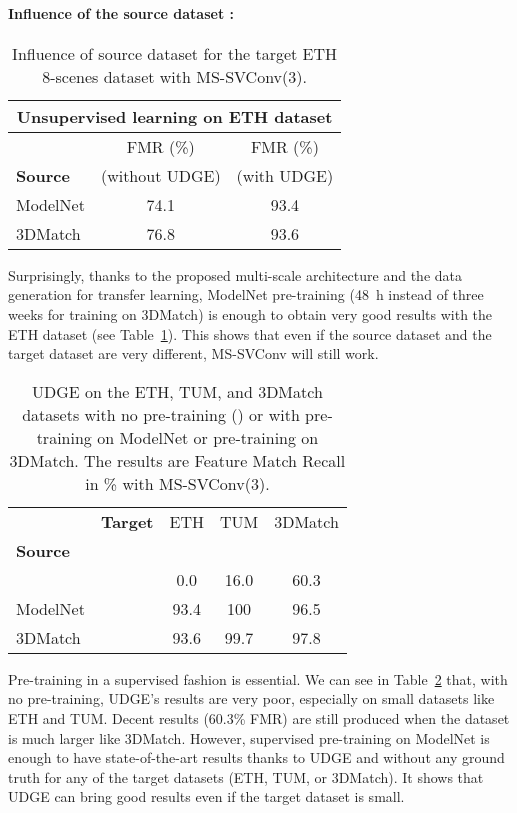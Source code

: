 \documentclass[10pt,twocolumn,letterpaper]{article}
\begin{document}
\paragraph{Influence of the source dataset :}
\begin{table}[ht]
\centering
\small
\begin{tabular}[t]{lcc}
\toprule
\multicolumn{3}{c}{\textbf{Unsupervised learning on ETH dataset}} \\
\midrule
 & FMR (\%) & FMR (\%) \\
\textbf{Source} & (without UDGE) & (with UDGE)\\
\midrule
ModelNet & 74.1 & 93.4  \\
3DMatch & 76.8 &  93.6 \\
\bottomrule
\end{tabular}
\caption{Influence of source dataset  for the target ETH 8-scenes dataset with MS-SVConv(3).}
\label{tab:pretrained}
\end{table}

Surprisingly, thanks to the proposed multi-scale architecture and the data generation for transfer learning, ModelNet pre-training (48~h instead of three weeks for training on 3DMatch) is enough to obtain very good results with the ETH dataset (see Table~\ref{tab:pretrained}). 
This shows that even if the source dataset and the target dataset are very different, MS-SVConv will still work.
\begin{table}[ht]
\centering
\small
\begin{tabular}[t]{llccc}
\toprule
& \textbf{Target} & ETH & TUM & 3DMatch \\
\textbf{Source} & &   &  &  \\
\midrule
 & & 0.0 & 16.0 & 60.3 \\
ModelNet &  & 93.4 & 100 & 96.5 \\
3DMatch &  & 93.6 & 99.7 & 97.8 \\
\bottomrule
\end{tabular}
\caption{UDGE on the ETH, TUM, and 3DMatch datasets with no pre-training () or with pre-training on ModelNet or pre-training on 3DMatch. The results are Feature Match Recall in \% with MS-SVConv(3).}
\label{tab:transfer}
\end{table}


Pre-training in a supervised fashion is essential. We can see in Table~\ref{tab:transfer} that, with no pre-training, UDGE's results are very poor, especially on small datasets like ETH and TUM. Decent results (60.3\% FMR) are still produced when the dataset is much larger like 3DMatch. However, supervised pre-training on ModelNet is enough to have state-of-the-art results thanks to UDGE and without any ground truth for any of the target datasets (ETH, TUM, or 3DMatch). It shows that UDGE can bring good results even if the target dataset is small. 
\end{document}
